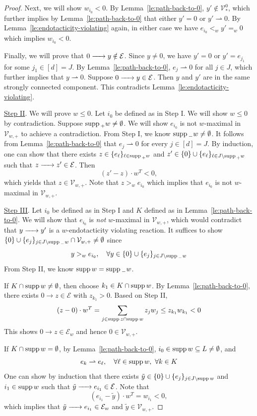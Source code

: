 \documentclass[10pt]{amsart}
\numberwithin{equation}{section}
\theoremstyle{plain}
\theoremstyle{definition}
\theoremstyle{remark}
\newcommand{\cE}{\mathcal{E}}
\newcommand{\cV}{\mathcal{V}}
\newcommand{\supp}{{\rm supp\,}}
\begin{document}
\begin{proof}
Next, we will show $w_{i_0}<0$. By Lemma~\ref{le:path-back-to-0},  $y'\notin\cV^0_*$, which further implies by  Lemma~\ref{le:path-back-to-0} that either $y'=0$ or $y'\rightharpoonup0$.  By Lemma~\ref{le:endotacticity-violating} again,  in either case we have $e_{i_0}<_wy'=_w0$ which implies $w_{i_0}<0$.

Finally, we will prove that $0\ce{->} y\notin\cE$. Since $y\neq0$, we have $y'=0$ or $y'=e_{j_1}$ for some $j_1\in [d]=J$. By Lemma~\ref{le:path-back-to-0},  $e_{j}\rightharpoonup 0$ for all $j\in J$, which further implies that $y\rightharpoonup 0$. Suppose $0\ce{->} y\in\cE$. Then $y$ and $y'$ are in the same strongly connected component. This contradicts Lemma~\ref{le:endotacticity-violating}.


\medskip

\noindent\underline{Step II}. We will prove $w\le0$. Let $i_0$ be defined as in Step I. We will show $w\le0$ by contradiction. 
Suppose $\supp_+w\neq\emptyset$. We will show $e_{i_0}$ is not $w$-maximal in $\cV_{w,+}$ to achieve a contradiction. From Step I, we know $\supp_-w\neq\emptyset$. 
It follows from Lemma~\ref{le:path-back-to-0} that $e_j\rightharpoonup0$ for every $j\in[d]=J$. By induction, one can show that there exists $z\in\{e_{\ell}\}_{\ell\in\supp_+w}$ and $z'\in\{0\}\cup\{e_{\ell}\}_{\ell\in J\setminus\supp_+w}$ such that $z\ce{->}z'\in\cE$. Then \[(z'-z)\cdot w^T<0,\] which yields that $z\in\cV_{w,+}$. Note that $z>_we_{i_0}$ which implies that $e_{i_0}$ is not $w$-maximal in $\cV_{w,+}$. 
\medskip

\noindent\underline{Step III}. Let $i_0$ be defined as in Step I and $K$ defined as in Lemma~\ref{le:path-back-to-0}. We will show that $e_{i_0}$ is \emph{not} $w$-maximal in $\cV_{w,+}$, which would contradict that $y\ce{->}y'$ is a $w$-endotacticity violating reaction. It suffices to show $\{0\}\cup\{e_j\}_{j\in J\setminus\supp_-w}\cap\cV_{w,+}\neq\emptyset$ since $$y>_we_{i_0},\quad \forall y\in\{0\}\cup\{e_j\}_{j\in J\setminus\supp_-w}$$ From Step II, we know $\supp w=\supp_-w$.

If $K\cap\supp w\neq\emptyset$, then choose  $k_1\in K\cap\supp w$. By Lemma~\ref{le:path-back-to-0}, there exists $0\to z\in\cE$ with $z_{k_1}>0$. Based on Step II, $$(z-0)\cdot w^T=\sum_{j\in\supp z\cap\supp w}z_jw_j\le z_{k_1}w_{k_1}<0$$ This shows $0\to z\in\cE_w$ and hence $0\in\cV_{w,+}$.


If $K\cap\supp w=\emptyset$, by Lemma~\ref{le:path-back-to-0}, $i_0\in\supp w\subseteq L\neq\emptyset$, and $$e_k\rightharpoonup e_{\ell},\quad \forall \ell\in \supp w,\ \forall k\in K$$
One can show by induction that there exists $\tilde{y}\in\{0\}\cup\{e_j\}_{j\in J\setminus\supp w}$ and $i_1\in\supp w$  such that $\tilde{y}\ce{->}e_{i_1}\in\cE$. Note that
\[(e_{i_1}-\tilde{y})\cdot w^T=w_{i_1}<0,\]
which implies that $\tilde{y}\ce{->}e_{i_1}\in\cE_w$ and $\tilde{y}\in\cV_{w,+}$. 
\medskip


\end{proof}
\end{document}
